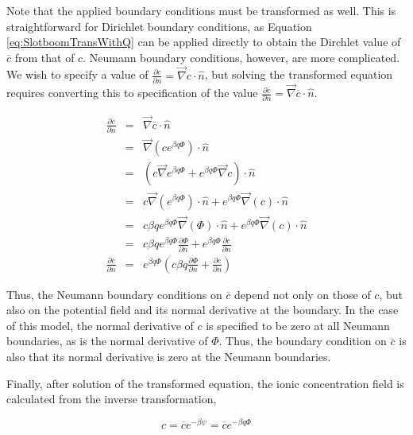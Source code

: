 Note that the applied boundary conditions must be transformed as well.
This is straightforward for Dirichlet boundary conditions,
as Equation \ref{eq:SlotboomTransWithQ} can be applied directly
to obtain the Dirchlet value of $\overline{c}$ from that of $c$.
Neumann boundary conditions, however, are more complicated.
We wish to specify a value of $\frac{\partial c}{\partial n} = \vec{\nabla} c \cdot \hat{n}$,
but solving the transformed equation requires converting this to specification of the value
$\frac{\partial \overline{c}}{\partial n} = \vec{\nabla} \overline{c} \cdot \hat{n}$.

\begin{equation}
\begin{array}{rcl}
\frac{\partial \overline{c}}{\partial n} & = & \vec{\nabla} \overline{c} \cdot \hat{n} \\
& = & \vec{\nabla} \left( c e^{\beta q \Phi} \right) \cdot \hat{n} \\
& = & \left( c \vec{\nabla} e^{\beta q \Phi} +  e^{\beta q \Phi} \vec{\nabla} c \right) \cdot \hat{n} \\
& = & c \vec{\nabla} \left(e^{\beta q \Phi} \right) \cdot \hat{n}
+ e^{\beta q \Phi} \vec{\nabla} \left( c \right) \cdot \hat{n} \\
& = & c \beta q e^{\beta q \Phi} \vec{\nabla} \left( \Phi \right) \cdot \hat{n}
+ e^{\beta q \Phi} \vec{\nabla} \left( c \right) \cdot \hat{n} \\
& = & c \beta q e^{\beta q \Phi} \frac{\partial \Phi}{\partial n}
+ e^{\beta q \Phi} \frac{\partial c}{\partial n} \\
\frac{\partial \overline{c}}{\partial n} & = & e^{\beta q \Phi}
\left( c \beta q \frac{\partial \Phi}{\partial n} + \frac{\partial c}{\partial n} \right)
\end{array}\end{equation}

Thus, the Neumann boundary conditions on $\overline{c}$ depend not only on
those of $c$, but also on the potential field and its normal derivative at the boundary.
In the case of this model, the normal derivative of $c$ is specified to be zero
at all Neumann boundaries, as is the normal derivative of $\Phi$.
Thus, the boundary condition on $\overline{c}$ is also that its normal derivative is zero
at the Neumann boundaries.

Finally, after solution of the transformed equation,
the ionic concentration field is calculated from the inverse transformation,

\begin{equation}
c = \overline{c} e^{-\beta \psi} = \overline{c} e^{-\beta q \Phi}
\end{equation}

